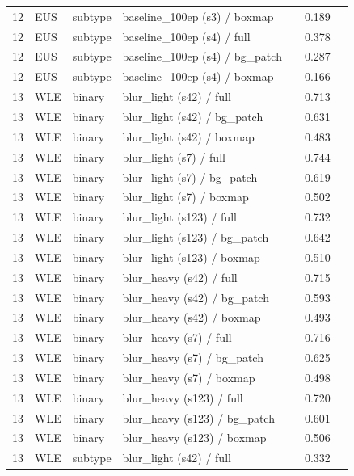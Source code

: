 \begin{longtable}{cL{1.1cm}L{1.5cm}L{5.6cm}ccc}
12 & EUS & subtype & baseline\_100ep (s3) / boxmap & \nl{} & 0.189 & \nl{} \\
12 & EUS & subtype & baseline\_100ep (s4) / full & \nl{} & 0.378 & \nl{} \\
12 & EUS & subtype & baseline\_100ep (s4) / bg\_patch & \nl{} & 0.287 & \nl{} \\
12 & EUS & subtype & baseline\_100ep (s4) / boxmap & \nl{} & 0.166 & \nl{} \\
13 & WLE & binary & blur\_light (s42) / full & \nl{} & 0.713 & \nl{} \\
13 & WLE & binary & blur\_light (s42) / bg\_patch & \nl{} & 0.631 & \nl{} \\
13 & WLE & binary & blur\_light (s42) / boxmap & \nl{} & 0.483 & \nl{} \\
13 & WLE & binary & blur\_light (s7) / full & \nl{} & 0.744 & \nl{} \\
13 & WLE & binary & blur\_light (s7) / bg\_patch & \nl{} & 0.619 & \nl{} \\
13 & WLE & binary & blur\_light (s7) / boxmap & \nl{} & 0.502 & \nl{} \\
13 & WLE & binary & blur\_light (s123) / full & \nl{} & 0.732 & \nl{} \\
13 & WLE & binary & blur\_light (s123) / bg\_patch & \nl{} & 0.642 & \nl{} \\
13 & WLE & binary & blur\_light (s123) / boxmap & \nl{} & 0.510 & \nl{} \\
13 & WLE & binary & blur\_heavy (s42) / full & \nl{} & 0.715 & \nl{} \\
13 & WLE & binary & blur\_heavy (s42) / bg\_patch & \nl{} & 0.593 & \nl{} \\
13 & WLE & binary & blur\_heavy (s42) / boxmap & \nl{} & 0.493 & \nl{} \\
13 & WLE & binary & blur\_heavy (s7) / full & \nl{} & 0.716 & \nl{} \\
13 & WLE & binary & blur\_heavy (s7) / bg\_patch & \nl{} & 0.625 & \nl{} \\
13 & WLE & binary & blur\_heavy (s7) / boxmap & \nl{} & 0.498 & \nl{} \\
13 & WLE & binary & blur\_heavy (s123) / full & \nl{} & 0.720 & \nl{} \\
13 & WLE & binary & blur\_heavy (s123) / bg\_patch & \nl{} & 0.601 & \nl{} \\
13 & WLE & binary & blur\_heavy (s123) / boxmap & \nl{} & 0.506 & \nl{} \\
13 & WLE & subtype & blur\_light (s42) / full & \nl{} & 0.332 & \nl{} \\

\end{longtable}
